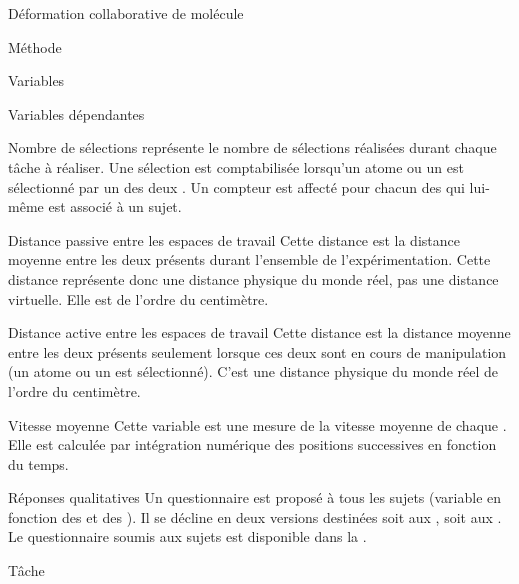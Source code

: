 \documentclass[myfrancais]{mythesis}
\begin{document}
\begin{mychapter}{Déformation collaborative de molécule}
\begin{mysection}{Méthode}
\begin{mysubsection}{Variables}
\begin{mysubsubsection}{Variables dépendantes}
\begin{myparagraph}{ Nombre de sélections}
						 représente le nombre de sélections réalisées durant chaque tâche à réaliser.
						Une sélection est comptabilisée lorsqu'un atome ou un  est sélectionné par un des deux .
						Un compteur est affecté pour chacun des  qui lui-même est associé à un sujet.
					\end{myparagraph}
					\begin{myparagraph}{ Distance passive entre les espaces de travail}
						Cette distance est la distance moyenne entre les deux  présents durant l'ensemble de l'expérimentation.
						Cette distance représente donc une distance physique du monde réel, pas une distance virtuelle.
						Elle est de l'ordre du centimètre.
					\end{myparagraph}
					\begin{myparagraph}{ Distance active entre les espaces de travail}
						Cette distance est la distance moyenne entre les deux  présents seulement lorsque ces deux  sont en cours de manipulation (un atome ou un  est sélectionné).
						C'est une distance physique du monde réel de l'ordre du centimètre.
					\end{myparagraph}
					\begin{myparagraph}{ Vitesse moyenne}
						Cette variable est une mesure de la vitesse moyenne de chaque .
						Elle est calculée par intégration numérique des positions successives en fonction du temps.
					\end{myparagraph}
					\begin{myparagraph}{ Réponses qualitatives}
						Un questionnaire est proposé à tous les sujets (variable en fonction des  et des ).
						Il se décline en deux versions destinées soit aux , soit aux .
						Le questionnaire soumis aux sujets est disponible dans la .
					\end{myparagraph}
				\end{mysubsubsection}
			\end{mysubsection}
			\begin{mysubsection}{Tâche}

\end{mysubsection}
\end{mysection}
\end{mychapter}
\end{document}
